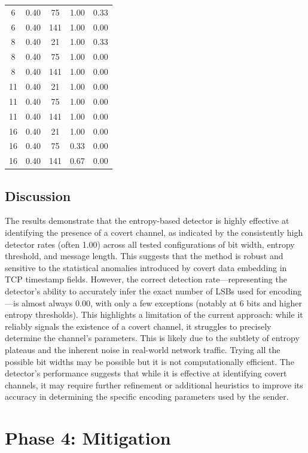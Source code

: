 \documentclass[10pt,a4paper]{article}
\begin{document}
\begin{center}
\begin{longtable}{ccccc}
6  & 0.40 & 75  & 1.00 & 0.33 \\
6  & 0.40 & 141 & 1.00 & 0.00 \\
8  & 0.40 & 21  & 1.00 & 0.33 \\
8  & 0.40 & 75  & 1.00 & 0.00 \\
8  & 0.40 & 141 & 1.00 & 0.00 \\
11 & 0.40 & 21  & 1.00 & 0.00 \\
11 & 0.40 & 75  & 1.00 & 0.00 \\
11 & 0.40 & 141 & 1.00 & 0.00 \\
16 & 0.40 & 21  & 1.00 & 0.00 \\
16 & 0.40 & 75  & 0.33 & 0.00 \\
16 & 0.40 & 141 & 0.67 & 0.00 \\
\end{longtable}
\end{center}

\subsection*{Discussion}
The results demonstrate that the entropy-based detector is highly effective at identifying the presence of a covert channel, as indicated by the consistently high detector rates (often 1.00) across all tested configurations of bit width, entropy threshold, and message length.
 This suggests that the method is robust and sensitive to the statistical anomalies introduced by covert data embedding in TCP timestamp fields.
However, the correct detection rate—representing the detector's ability to accurately infer the exact number of LSBs used for encoding—is almost always 0.00, with only a few exceptions (notably at 6 bits and higher entropy thresholds).
 This highlights a limitation of the current approach: while it reliably signals the existence of a covert channel, it struggles to precisely determine the channel's parameters. 
This is likely due to the subtlety of entropy plateaus and the inherent noise in real-world network traffic.
Trying all the possible bit widths may be possible but it is not computationally efficient.
The detector's performance suggests that while it is effective at identifying covert channels, it may require further refinement or additional heuristics to improve its accuracy in determining the specific encoding parameters used by the sender.
\newpage
\section*{Phase 4: Mitigation}
\end{document}
